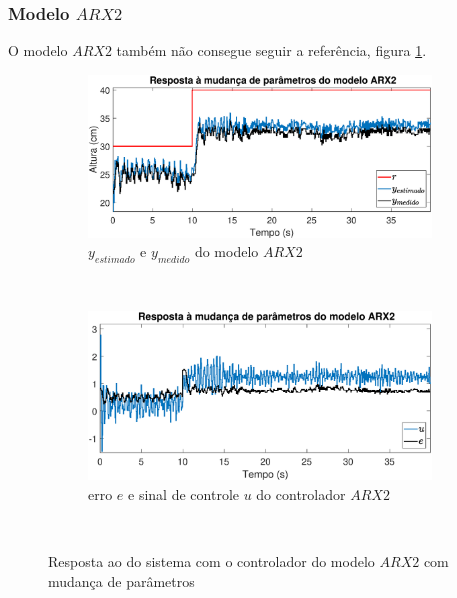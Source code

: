 \subsubsection{Modelo $ARX2$}
O modelo $ARX2$ também não consegue seguir a referência, figura \ref{fig:mprarx2y}.
\begin{figure}[htb]
	\centering
	\begin{subfigure}[t]{0.48\textwidth}
		\includegraphics[width=1\linewidth]{mprarx2y}
		\caption[$y_{estimado}$ e $y_{medido}$ do modelo $ARX2$]{$y_{estimado}$ e $y_{medido}$ do modelo $ARX2$}
		\label{fig:mprarx2y}
	\end{subfigure}
	~ %
	\begin{subfigure}[t]{0.48\textwidth}
		\includegraphics[width=1\linewidth]{mprarx2e}
		\caption[erro $e$ e sinal de controle $u$ do controlador $ARX2$]{erro $e$ e sinal de controle $u$ do controlador $ARX2$}
		\label{fig:mprarx2e}
	\end{subfigure}
	~ %
	
	\caption{Resposta ao do sistema com o controlador do modelo $ARX2$ com mudança de parâmetros}\label{fig:mprarx2}
\end{figure}

